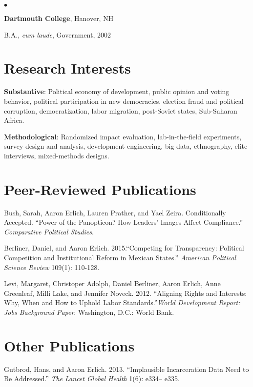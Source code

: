 \documentclass[margin,line]{res}
\newenvironment{list1}{
  \begin{list}{\ding{113}}{%
      \setlength{\itemsep}{0in}
      \setlength{\parsep}{0in} \setlength{\parskip}{0in}
      \setlength{\topsep}{0in} \setlength{\partopsep}{0in} 
      \setlength{\leftmargin}{0.17in}}}{\end{list}}
\newenvironment{list2}{
  \begin{list}{$\bullet$}{%
      \setlength{\itemsep}{0in}
      \setlength{\parsep}{0in} \setlength{\parskip}{0in}
      \setlength{\topsep}{0in} \setlength{\partopsep}{0in} 
      \setlength{\leftmargin}{0.2in}}}{\end{list}}
\begin{document}
{\begin{resume}
\begin{list1}
\begin{list2}
\end{list2}
\end{list1}

{\bf Dartmouth College}, Hanover, NH\\
\vspace*{-.1in}
\begin{list1}
\item[] B.A., \emph{cum laude}, Government,  2002
\end{list1}

\section{\sc Research Interests}
\textbf{Substantive}: Political economy of development, public opinion
and voting behavior, political participation in new
democracies, election fraud and
political corruption, democratization,  labor migration, post-Soviet states, Sub-Saharan Africa.

\textbf{Methodological}: Randomized impact evaluation,
lab-in-the-field experiments, survey design and analysis, development engineering, big data, ethnography, elite
interviews, mixed-methods designs.

\section{\sc Peer-Reviewed Publications}

Bush, Sarah, Aaron Erlich, Lauren Prather, and Yael
Zeira. Conditionally Accepted. ``Power of the Panopticon? How Leaders' Images Affect Compliance.''
\emph{Comparative Political Studies}.

Berliner, Daniel,  and Aaron Erlich. 2015.``Competing for
Transparency: Political Competition and Institutional Reform in
Mexican States.'' \emph{American Political Science Review} 109(1): 110-128.

Levi, Margaret, Christoper Adolph, Daniel Berliner, Aaron Erlich, Anne
Greenleaf, Milli Lake, and Jennifer Noveck. 2012. ``Aligning Rights and
Interests: Why, When and How to Uphold Labor Standards.''\emph{World
  Development Report: Jobs Background Paper}. Washington, D.C.: World
Bank.

\section{\sc  Other Publications}
Gutbrod, Hans, and Aaron Erlich. 2013. ``Implausible Incarceration
Data Need to Be Addressed.'' \emph{The Lancet Global Health} 1(6):
e334-- e335.


\end{resume}}
\end{document}
